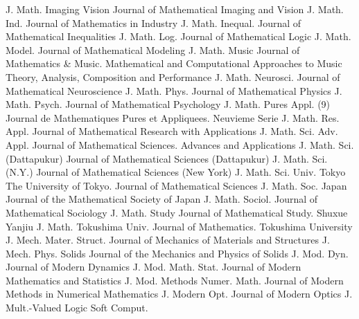{J. Math. Imaging Vision}
{Journal of Mathematical Imaging and Vision}
{J. Math. Ind.}
{Journal of Mathematics in Industry}
{J. Math. Inequal.}
{Journal of Mathematical Inequalities}
{J. Math. Log.}
{Journal of Mathematical Logic}
{J. Math. Model.}
{Journal of Mathematical Modeling}
{J. Math. Music}
{Journal of Mathematics & Music. Mathematical and Computational Approaches to Music Theory, Analysis, Composition and Performance}
{J. Math. Neurosci.}
{Journal of Mathematical Neuroscience}
{J. Math. Phys.}
{Journal of Mathematical Physics}
{J. Math. Psych.}
{Journal of Mathematical Psychology}
{J. Math. Pures Appl. (9)}
{Journal de Mathematiques Pures et Appliquees. Neuvieme Serie}
{J. Math. Res. Appl.}
{Journal of Mathematical Research with Applications}
{J. Math. Sci. Adv. Appl.}
{Journal of Mathematical Sciences. Advances and Applications}
{J. Math. Sci. (Dattapukur)}
{Journal of Mathematical Sciences (Dattapukur)}
{J. Math. Sci. (N.Y.)}
{Journal of Mathematical Sciences (New York)}
{J. Math. Sci. Univ. Tokyo}
{The University of Tokyo. Journal of Mathematical Sciences}
{J. Math. Soc. Japan}
{Journal of the Mathematical Society of Japan}
{J. Math. Sociol.}
{Journal of Mathematical Sociology}
{J. Math. Study}
{Journal of Mathematical Study. Shuxue Yanjiu}
{J. Math. Tokushima Univ.}
{Journal of Mathematics. Tokushima University}
{J. Mech. Mater. Struct.}
{Journal of Mechanics of Materials and Structures}
{J. Mech. Phys. Solids}
{Journal of the Mechanics and Physics of Solids}
{J. Mod. Dyn.}
{Journal of Modern Dynamics}
{J. Mod. Math. Stat.}
{Journal of Modern Mathematics and Statistics}
{J. Mod. Methods Numer. Math.}
{Journal of Modern Methods in Numerical Mathematics}
{J. Modern Opt.}
{Journal of Modern Optics}
{J. Mult.-Valued Logic Soft Comput.}
